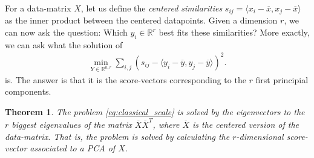 \documentclass{article}
\newcommand{\sprod}[1]{\langle #1 \rangle}
\newcommand{\R}{\mathbb{R}}
\newtheorem{theorem}{Theorem}
\begin{document}
For a data-matrix $X$, let us define the \emph{centered similarities} $s_{ij} =\sprod{x_i-\overline{x},x_j- \overline{x}}$ as the inner product between the centered datapoints. Given a dimension $r$, we can now ask the question: Which $y_i\in \R^r$ best fits these similarities? More exactly, we can ask what the solution of 
\begin{align}
    \min_{Y\in \R^{n,r}} \sum_{i,j} \left(s_{ij} - \sprod{y_i-\overline{y},y_j-\overline{y}}\right)^2. \label{eq:classical_scale}
\end{align}
is. The answer is that it is the score-vectors corresponding to the $r$ first principial components.
\begin{theorem}
    The problem \eqref{eq:classical_scale} is solved by the eigenvectors to the $r$ biggest eigenvalues of the matrix $\overline{X}\overline{X}^T$, where $\overline{X}$ is the centered version of the data-matrix. That is, the problem is solved by calculating the $r$-dimensional score-vector associated to a PCA of $X$.
\end{theorem}
\end{document}
